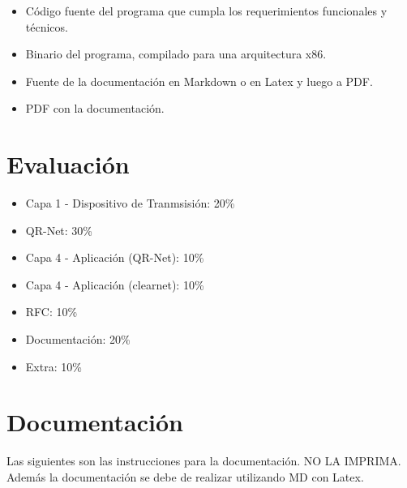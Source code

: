 \documentclass{article}
\providecommand{\tightlist}{%
          \setlength{\itemsep}{0pt}\setlength{\parskip}{0pt}}
\begin{document}
\begin{itemize}
\tightlist
\item
  Código fuente del programa que cumpla los requerimientos funcionales y
  técnicos.
\item
  Binario del programa, compilado para una arquitectura x86.
\item
  Fuente de la documentación en Markdown o en Latex y luego a PDF.
\item
  PDF con la documentación.
\end{itemize}

\section{Evaluación}\label{evaluaciuxf3n}

\begin{itemize}
\tightlist
\item
  Capa 1 - Dispositivo de Tranmsisión: 20\%
\item
  QR-Net: 30\%
\item
  Capa 4 - Aplicación (QR-Net): 10\%
\item
  Capa 4 - Aplicación (clearnet): 10\%
\item
  RFC: 10\%
\item
  Documentación: 20\%
\item
  Extra: 10\%
\end{itemize}

\section{Documentación}\label{documentaciuxf3n}

Las siguientes son las instrucciones para la documentación. NO LA
IMPRIMA. Además la documentación se debe de realizar utilizando MD con
Latex.
\end{document}
